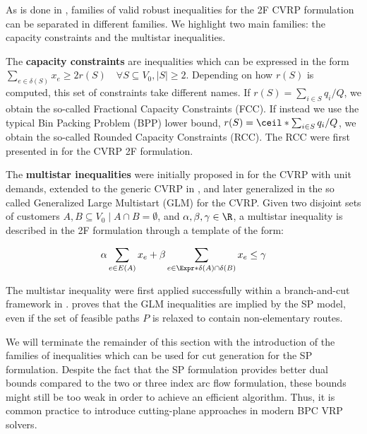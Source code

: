 As is done in \textcite{toth2014},
families of valid robust inequalities for the 2F CVRP formulation
can be separated in different families.
We highlight two main families: the capacity constraints and the multistar inequalities.

The \textbf{capacity constraints} are inequalities which can be expressed in the form
$\sum_{e \in \delta(S)} x_e \ge 2 r(S) \quad \forall S \subseteq V_0, |S| \ge 2$.
Depending on how $r(S)$ is computed, this set of constraints take different names.
If $r(S) = \sum_{i \in S} q_i / Q$, we obtain the so-called Fractional Capacity Constraints (FCC).
If instead we use the typical Bin Packing Problem (BPP) lower bound, $r(S) = \ceil*{\sum_{i \in S} q_i / Q}$, we obtain the so-called Rounded Capacity Constraints (RCC).
The RCC were first presented in \textcite{laporte1983} for the CVRP 2F formulation.

The \textbf{multistar inequalities} were initially proposed in \textcite{araque1990} for the CVRP with unit demands,
extended to the generic CVRP in \textcite{gouveia1995, achuthan1998},
and later generalized in the so called Generalized Large Multistart (GLM) \textcite{letchford2002} for the CVRP.
Given two disjoint sets of customers $A, B \subseteq V_0 \mid A \cap B = \emptyset$,
and $\alpha, \beta, \gamma \in \R$,
a multistar inequality is described in the 2F formulation through a
template of the form:

\begin{equation}
	\alpha \sum_{e \in E(A)} x_e + \beta \sum_{e \in \Expr*{\delta(A) \cap \delta(B)}} x_e \le \gamma
\end{equation}

The multistar inequality were first applied successfully within a branch-and-cut framework
in \textcite{araqueg1994}.
\textcite{letchford2006} proves that the GLM inequalities are implied by the SP model,
even if the set of feasible paths $P$ is relaxed to contain non-elementary routes.

\medskip


We will terminate the remainder of this section with the introduction
of the families of inequalities which can be used for cut generation
for the SP formulation.
Despite the fact that the SP formulation provides better dual bounds
compared to the two or three index arc flow formulation,
these bounds might still be too weak in order to achieve an efficient algorithm.
Thus, it is common practice to introduce cutting-plane approaches
in modern BPC VRP solvers.

